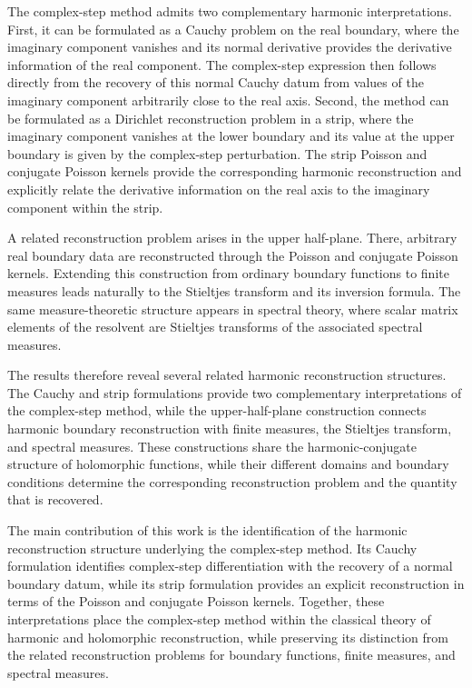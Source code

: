 \documentclass[11pt]{article}
\begin{document}
    The complex-step method admits two complementary harmonic
    interpretations. First, it can be formulated as a Cauchy problem on the
    real boundary, where the imaginary component vanishes and its normal
    derivative provides the derivative information of the real component.
    The complex-step expression then follows directly from the recovery of
    this normal Cauchy datum from values of the imaginary component
    arbitrarily close to the real axis. Second, the method can be formulated
    as a Dirichlet reconstruction problem in a strip, where the imaginary
    component vanishes at the lower boundary and its value at the upper
    boundary is given by the complex-step perturbation. The strip Poisson
    and conjugate Poisson kernels provide the corresponding harmonic
    reconstruction and explicitly relate the derivative information on the
    real axis to the imaginary component within the strip.
    
    A related reconstruction problem arises in the upper half-plane. There,
    arbitrary real boundary data are reconstructed through the Poisson and
    conjugate Poisson kernels. Extending this construction from ordinary
    boundary functions to finite measures leads naturally to the Stieltjes
    transform and its inversion formula. The same measure-theoretic
    structure appears in spectral theory, where scalar matrix elements of
    the resolvent are Stieltjes transforms of the associated spectral
    measures.
    
    The results therefore reveal several related harmonic reconstruction
    structures. The Cauchy and strip formulations provide two complementary
    interpretations of the complex-step method, while the upper-half-plane
    construction connects harmonic boundary reconstruction with finite
    measures, the Stieltjes transform, and spectral measures. These
    constructions share the harmonic-conjugate structure of holomorphic
    functions, while their different domains and boundary conditions
    determine the corresponding reconstruction problem and the quantity
    that is recovered.
    
    The main contribution of this work is the identification of the
    harmonic reconstruction structure underlying the complex-step method.
    Its Cauchy formulation identifies complex-step differentiation with the
    recovery of a normal boundary datum, while its strip formulation
    provides an explicit reconstruction in terms of the Poisson and
    conjugate Poisson kernels. Together, these interpretations place the
    complex-step method within the classical theory of harmonic and
    holomorphic reconstruction, while preserving its distinction from the
    related reconstruction problems for boundary functions, finite
    measures, and spectral measures.
    
\end{document}
